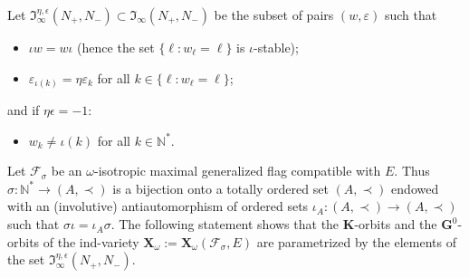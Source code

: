 \documentclass{amsart}
\theoremstyle{definition}
\newcommand{\NN}{\mathbb{N}^*}
\begin{document}
Let $\mathfrak{I}_\infty^{\eta,\epsilon}(N_+,N_-)\subset
\mathfrak{I}_\infty(N_+,N_-)$ be the subset of pairs
$(w,\varepsilon)$ such that 
\begin{itemize}
\item[\rm (i)] $\iota w=w\iota$ (hence the set $\{\ell:w_\ell=\ell\}$ is $\iota$-stable);
\item[\rm (ii)] $\varepsilon_{\iota(k)}=\eta\varepsilon_k$ for all $k\in\{\ell:w_\ell=\ell\}$;
\end{itemize}
and if $\eta\epsilon=-1$:
\begin{itemize}
\item[\rm (iii)] $w_k\not=\iota(k)$ for all $k\in\mathbb{N}^*$.
\end{itemize}

Let $\mathcal{F}_\sigma$ be an $\omega$-isotropic maximal generalized flag compatible with $E$.
Thus $\sigma:\NN\to(A,\prec)$ is a bijection
onto a totally ordered set $(A,\prec)$ endowed with an (involutive) antiautomorphism of ordered sets
$\iota_A:(A,\prec)\to (A,\prec)$ such that $\sigma\iota=\iota_A\sigma$.
The following statement shows that the $\mathbf{K}$-orbits and the $\mathbf{G}^0$-orbits
of the ind-variety $\mathbf{X}_\omega:=\mathbf{X}_\omega(\mathcal{F}_\sigma,E)$
are parametrized by the elements of the set $\mathfrak{I}_\infty^{\eta,\epsilon}(N_+,N_-)$.
\end{document}
